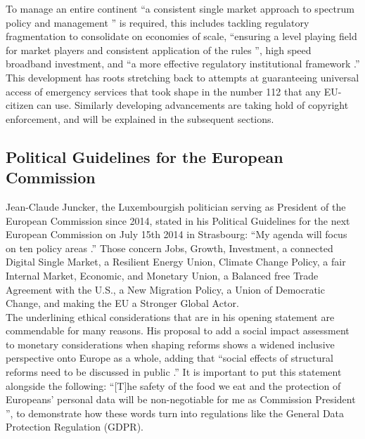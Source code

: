 \documentclass[a4paper]{article}
\begin{document}
\noindent
To manage an entire continent ``a consistent single market approach to spectrum policy and management \cite{ATC}'' is required, this includes tackling regulatory fragmentation to consolidate on economies of scale, ``ensuring a level playing field for market players and consistent application of the rules \cite{ATC}'', high speed broadband investment, and ``a more effective regulatory institutional framework \cite{ATC}.'' \\

\noindent
This development has roots stretching back to attempts at guaranteeing universal access of emergency services that took shape in the number 112 that any EU-citizen can use. Similarly developing advancements are taking hold of copyright enforcement, and will be explained in the subsequent sections.

\subsection{Political Guidelines for the European Commission}

Jean-Claude Juncker, the Luxembourgish politician serving as President of the European Commission since 2014, stated in his Political Guidelines for the next European Commission on July 15th 2014 in Strasbourg: ``My agenda will focus on ten policy areas \cite{JCJ}.'' Those concern Jobs, Growth, Investment, a connected Digital Single Market, a Resilient Energy Union, Climate Change Policy, a fair Internal Market, Economic, and Monetary Union, a Balanced free Trade Agreement with the U.S., a New Migration Policy, a Union of Democratic Change, and making the EU a Stronger Global Actor. \\

\noindent
The underlining ethical considerations that are in his opening statement are commendable for many reasons. His proposal to add a social impact assessment to monetary considerations when shaping reforms shows a widened inclusive perspective onto Europe as a whole, adding that ``social effects of structural reforms need to be discussed in public \cite{JCJ}.'' It is important to put this statement alongside the following: ``[T]he safety of the food we eat and the protection of Europeans' personal data will be non-negotiable for me as Commission President \cite{JCJ}'', to demonstrate how these words turn into regulations like the General Data Protection Regulation (GDPR). \\
\end{document}
